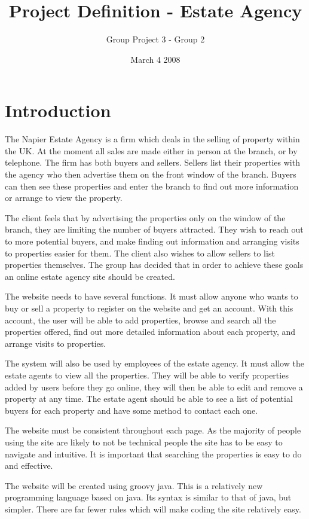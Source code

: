 \documentclass[a4paper,12pt]{article}
\title{Project Definition  - Estate Agency}
\author{Group Project 3 - Group 2}
\date{March 4 2008}
\begin{document}
\maketitle
\newpage
\tableofcontents
\newpage


 

\section{Introduction}
The Napier Estate Agency is a firm which deals in the selling of property within the UK. At the moment all sales are made either in person at the branch, or by telephone. The firm has both buyers and sellers. Sellers list their properties with the agency who then advertise them on the front window of the branch. Buyers can then see these properties and enter the branch to find out more information or arrange to view the property.

The client feels that by advertising the properties only on the window of the branch, they are limiting the number of buyers attracted. They wish to reach out to more potential buyers, and make finding out information and arranging visits to properties easier for them. The client also wishes to allow sellers to list properties themselves. The group has decided that in order to achieve these goals an online estate agency site should be created.

The website needs to have several functions. It must allow anyone who wants to buy or sell a property to register on the website and get an account. With this account, the user will be able to add properties, browse and search all the properties offered, find out more detailed information about each property, and arrange visits to properties.

The system will also be used by employees of the estate agency. It must allow the estate agents to view all the properties. They will be able to verify properties added by users before they go online, they will then be able to edit and remove a property at any time. The estate agent should be able to see a list of potential buyers for each property and have some method to contact each one.

The website must be consistent throughout each page. As the majority of people using the site are likely to not be technical people the site has to be easy to navigate and intuitive. It is important that searching the properties is easy to do and effective.

The website will be created using groovy java. This is a relatively new programming language based on java. Its syntax is similar to that of java, but simpler. There are far fewer rules which will make coding the site relatively easy.
\end{document}
